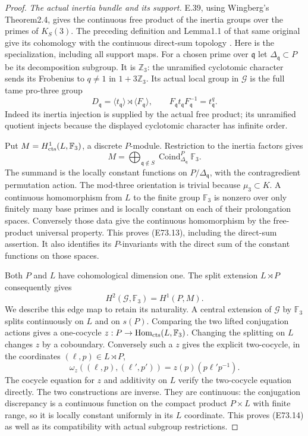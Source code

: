 \begin{proof}
\emph{The actual inertia bundle and its support.}
E.39, using Wingberg's Theorem2.4, gives the continuous
free product of the inertia groups over the primes of
$K_S(3)$. The preceding definition and Lemma1.1 of that
same original give its cohomology with the continuous
direct-sum topology
\cite[pp.~4--5, Lemma1.1; pp.~13--14, Theorem2.4]{E_WingbergRiemann}.
Here is the specialization, including all support maps.
For a chosen prime over $\mathfrak q$ let
$\Delta_{\mathfrak q}\subset P$ be its decomposition
subgroup. It is $\mathbb Z_3$: the unramified cyclotomic
character sends its Frobenius to $q\ne1$ in
$1+3\mathbb Z_3$. Its actual local group in $\mathcal G$
is the full tame pro-three group
\[
 D_{\mathfrak q}=\langle t_{\mathfrak q}\rangle
                    \rtimes\langle F_{\mathfrak q}\rangle,
 \qquad F_{\mathfrak q}t_{\mathfrak q}F_{\mathfrak q}^{-1}
          =t_{\mathfrak q}^{q}.
 \tag{E73.12}
\]
Indeed its inertia injection is supplied by the actual
free product; its unramified quotient injects because
the displayed cyclotomic character has infinite order.

Put $M=H^1_{\rm cts}(L,\mathbb F_3)$, a discrete
$P$-module. Restriction to the inertia factors gives
\[
 M=\bigoplus_{\mathfrak q\notin S}
       \operatorname{Coind}_{\Delta_{\mathfrak q}}^P\mathbb F_3.
 \tag{E73.13}
\]
The summand is the locally constant functions on
$P/\Delta_{\mathfrak q}$, with the contragredient
permutation action. The mod-three orientation is
trivial because $\mu_3\subset K$. A continuous
homomorphism from $L$ to the finite group $\mathbb F_3$
is nonzero over only finitely many base primes and is
locally constant on each of their prolongation spaces.
Conversely those data give the continuous homomorphism
by the free-product universal property. This proves
(E73.13), including the direct-sum assertion. It also
identifies its $P$-invariants with the direct sum of
the constant functions on those spaces.

Both $P$ and $L$ have cohomological dimension one.
The split extension $L\rtimes P$ consequently gives
\[
 H^2(\mathcal G,\mathbb F_3)=H^1(P,M).
 \tag{E73.14}
\]
We describe this edge map to retain its naturality.
A central extension of $\mathcal G$ by $\mathbb F_3$
splits continuously on $L$ and on $s(P)$. Comparing
the two lifted conjugation actions gives a one-cocycle
$z:P\to\operatorname{Hom}_{\rm cts}(L,\mathbb F_3)$.
Changing the splitting on $L$ changes $z$ by a
coboundary. Conversely such a $z$ gives the explicit
two-cocycle, in the coordinates $(\ell,p)\in L\rtimes P$,
\[
 \omega_z((\ell,p),(\ell',p'))
               =z(p)(p\ell'p^{-1}).
 \tag{E73.15}
\]
The cocycle equation for $z$ and additivity on $L$
verify the two-cocycle equation directly. The two
constructions are inverse. They are continuous:
the conjugation discrepancy is a continuous function
on the compact product $P\times L$ with finite range,
so it is locally constant uniformly in its $L$
coordinate. This proves (E73.14) as well as its
compatibility with actual subgroup restrictions.


\end{proof}
